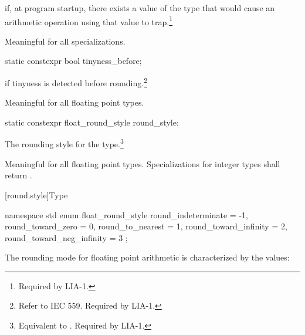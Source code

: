 \begin{itemdescr}
\pnum
{}
if, at program startup, there exists a value of the type that would cause
an arithmetic operation using that value to trap.\footnote{Required by LIA-1.}

\pnum
Meaningful for all specializations.
\end{itemdescr}

\begin{itemdecl}
static constexpr bool tinyness_before;
\end{itemdecl}

\begin{itemdescr}
\pnum
{}
if tinyness is detected before rounding.\footnote{Refer to IEC 559.
Required by LIA-1.}

\pnum
Meaningful for all floating point types.
\end{itemdescr}

\begin{itemdecl}
static constexpr float_round_style round_style;
\end{itemdecl}

\begin{itemdescr}
\pnum
The rounding style for the type.\footnote{Equivalent to .
Required by LIA-1.}

\pnum
Meaningful for all floating point types.
Specializations for integer types shall return
.
\end{itemdescr}

[round.style]{Type }

%
\begin{codeblock}
namespace std {
  enum float_round_style {
    round_indeterminate       = -1,
    round_toward_zero         =  0,
    round_to_nearest          =  1,
    round_toward_infinity     =  2,
    round_toward_neg_infinity =  3
  };
}
\end{codeblock}

\pnum
The rounding mode for floating point arithmetic is characterized by the
values:

